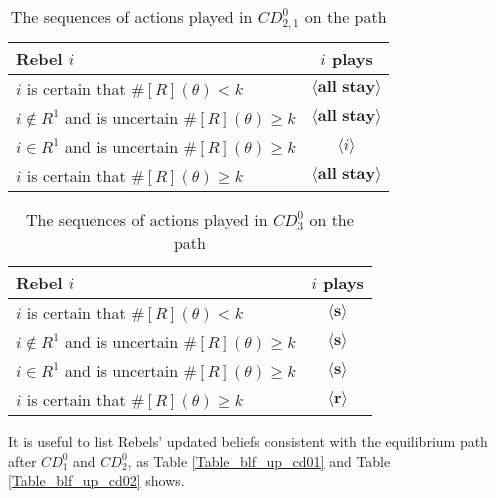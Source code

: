 \documentclass[12pt,letter]{article}
\theoremstyle{definition}
\theoremstyle{remark}
\theoremstyle{claim}
\begin{document}
\begin{table}[!htbp]
\caption{The sequences of actions played in $CD^0_{2,1}$ on the path}
\label{Table_cd021}
\begin{center}
\begin{tabular}{l c}
Rebel $i$ 	 	&  	$i$ plays		 \\
\hline
\hline
$i$ is certain that $\#[R](\theta)<k$ 	& 	$\langle \textbf{all stay} \rangle$	\\
$i\notin R^{1}$ and is uncertain $\#[R](\theta)\geq k$	& 	$\langle \textbf{all stay} \rangle$	\\
$i\in R^{1}$ and is uncertain $\#[R](\theta)\geq k$ &  $\langle i \rangle$  \\
$i$ is certain that $\#[R](\theta)\geq k$ &  $\langle \textbf{all stay} \rangle$  \\
\hline
\end{tabular}
\end{center}
\end{table}

\begin{table}[!htbp]
\caption{The sequences of actions played in $CD^0_{3}$ on the path}
\label{Table_cd03v}
\begin{center}
\begin{tabular}{l c}
Rebel $i$ 	 	&  	$i$ plays		 \\
\hline
\hline
$i$ is certain that $\#[R](\theta)<k$ 	& 	$\langle \textbf{s} \rangle$	\\
$i\notin R^{1}$ and is uncertain $\#[R](\theta)\geq k$	& 	$\langle \textbf{s} \rangle$	\\
$i\in R^{1}$ and is uncertain $\#[R](\theta)\geq k$ &  $\langle \textbf{s} \rangle$  \\
$i$ is certain that $\#[R](\theta)\geq k$ &  $\langle \textbf{r} \rangle$  \\
\hline
\end{tabular}
\end{center}
\end{table}
\clearpage

It is useful to list Rebels' updated beliefs consistent with the equilibrium path after $CD^0_1$ and $CD^0_2$, as Table \ref{Table_blf_up_cd01} and Table \ref{Table_blf_up_cd02} shows.
\end{document}
